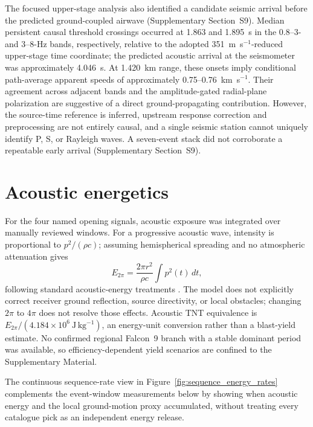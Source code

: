\documentclass[]{seismica}
\begin{document}
The focused upper-stage analysis also identified a candidate seismic arrival
before the predicted ground-coupled airwave (Supplementary Section~S9).
Median persistent causal threshold crossings occurred at 1.863 and 1.895~s
in the 0.8--3- and 3--8-Hz bands, respectively, relative to the adopted
351~m~s$^{-1}$-reduced upper-stage time coordinate; the predicted acoustic
arrival at the seismometer was approximately 4.046~s. At 1.420~km range,
these onsets imply conditional path-average apparent speeds of approximately
0.75--0.76~km~s$^{-1}$. Their agreement across adjacent bands and the
amplitude-gated radial-plane polarization are suggestive of a direct
ground-propagating contribution. However, the source-time reference is
inferred, upstream response correction and preprocessing are not entirely
causal, and a single seismic station cannot uniquely identify P, S, or
Rayleigh waves. A seven-event stack did not corroborate a repeatable early
arrival (Supplementary Section~S9).

\section{Acoustic energetics}
\label{sec:energetics}

For the four named opening signals, acoustic exposure was integrated over
manually reviewed windows. For a progressive acoustic wave, intensity is
proportional to $p^2/(\rho c)$; assuming hemispherical spreading and no
atmospheric attenuation gives
\begin{equation}
 E_{2\pi}=\frac{2\pi r^2}{\rho c}\int p^2(t)\,dt,
 \label{eq:acoustic_energy}
\end{equation}
following standard acoustic-energy treatments
\citep[e.g.,][]{johnson_aster_2005}. The model does not explicitly correct
receiver ground reflection, source directivity, or local obstacles; changing
$2\pi$ to $4\pi$ does not resolve those effects. Acoustic TNT equivalence is
$E_{2\pi}/(4.184\times10^6~\mathrm{J\,kg^{-1}})$, an energy-unit conversion
rather than a blast-yield estimate. No confirmed regional Falcon~9 branch with
a stable dominant period was available, so efficiency-dependent yield scenarios
are confined to the Supplementary Material.

The continuous sequence-rate view in
Figure~\ref{fig:sequence_energy_rates} complements the event-window
measurements below by showing when acoustic energy and the local ground-motion
proxy accumulated, without treating every catalogue pick as an independent
energy release.
\end{document}
